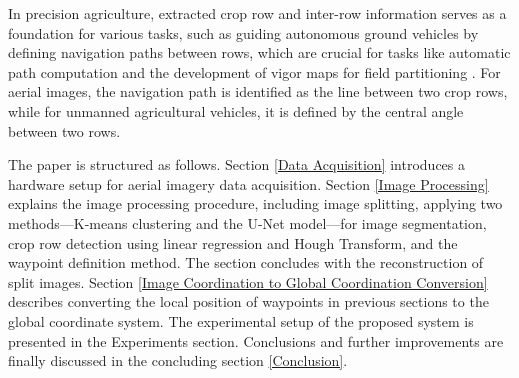 \documentclass[conference]{IEEEtran}
\begin{document}
In precision agriculture, extracted crop row and inter-row information serves as a foundation for various tasks, such as guiding autonomous ground vehicles by defining navigation paths between rows, which are crucial for tasks like automatic path computation and the development of vigor maps for field partitioning \cite{b11}. For aerial images, the navigation path is identified as the line between two crop rows, while for unmanned agricultural vehicles, it is defined by the central angle between two rows\cite{b1}.

The paper is structured as follows. Section \ref{Data Acquisition} introduces a hardware setup for aerial imagery data acquisition. Section \ref{Image Processing} explains the image processing procedure, including image splitting, applying two methods—K-means clustering and the U-Net model—for image segmentation, crop row detection using linear regression and Hough Transform, and the waypoint definition method. The section concludes with the reconstruction of split images. Section \ref{Image Coordination to Global Coordination Conversion} describes converting the local position of waypoints in previous sections to the global coordinate system. The experimental setup of the proposed system is presented in the Experiments section. Conclusions and further improvements are finally discussed in the concluding section
\ref{Conclusion}.
\end{document}
